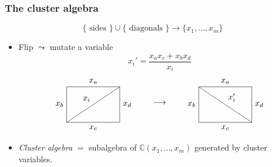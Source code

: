 \documentclass[aspectratio=169]{beamer}
\begin{document}
\begin{frame}
	\frametitle{The cluster algebra}

	\begin{equation*}
		\{\text{ sides }\} \cup \{ \text{ diagonals }\} \longrightarrow \{x_1, \dotsc, x_m\}
	\end{equation*}
	\pause
	\begin{itemize}
		\item Flip $\leadsto$ mutate a variable
		      \begin{equation*}
			      x_i' = \frac{x_a x_c + x_b x_d}{x_i}
		      \end{equation*}
		      \begin{equation*}
			      \begin{tikzpicture}[baseline]
				      \node[name=r, draw, inner sep = 5ex, xscale = 1.5]     {};
				      \node[above] at  (r.north) {$x_a$};
				      \node[left]  at  (r.west) {$x_b$};
				      \node[below] at  (r.south) {$x_c$};
				      \node[right] at  (r.east) {$x_d$};
				      \draw (r.south west) edge["$x_i$"] (r.north east);
			      \end{tikzpicture}
			      \qquad\longrightarrow\qquad
			      \begin{tikzpicture}[baseline]
				      \node[name=r, draw, inner sep = 5ex, xscale = 1.5]        {};
				      \node[above] at  (r.north) {$x_a$};
				      \node[left]  at  (r.west) {$x_b$};
				      \node[below] at  (r.south) {$x_c$};
				      \node[right] at  (r.east) {$x_d$};
				      \draw (r.north west) edge["$x_i'$"] (r.south east);
			      \end{tikzpicture}
		      \end{equation*}
		      \pause
		\item \emph{Cluster algebra} $=$ subalgebra of $\mathbb{C}(x_1, \dotsc, x_m)$ generated by cluster variables.
	\end{itemize}

\end{frame}
\end{document}

